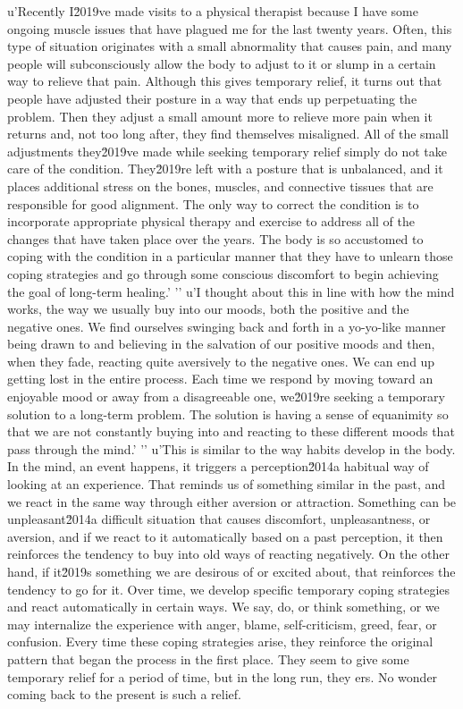 u'Recently I\u2019ve made visits to a physical therapist because I have some ongoing muscle issues that have plagued me for the last twenty years. Often, this type of situation originates with a small abnormality that causes pain, and many people will subconsciously allow the body to adjust to it or slump in a certain way to relieve that pain. Although this gives temporary relief, it turns out that people have adjusted their posture in a way that ends up perpetuating the problem. Then they adjust a small amount more to relieve more pain when it returns and, not too long after, they find themselves misaligned. All of the small adjustments they\u2019ve made while seeking temporary relief simply do not take care of the condition. They\u2019re left with a posture that is unbalanced, and it places additional stress on the bones, muscles, and connective tissues that are responsible for good alignment. The only way to correct the condition is to incorporate appropriate physical therapy and exercise to address all of the changes that have taken place over the years. The body is so accustomed to coping with the condition in a particular manner that they have to unlearn those coping strategies and go through some conscious discomfort to begin achieving the goal of long-term healing.'
'\n'
u'I thought about this in line with how the mind works, the way we usually buy into our moods, both the positive and the negative ones. We find ourselves swinging back and forth in a yo-yo-like manner being drawn to and believing in the salvation of our positive moods and then, when they fade, reacting quite aversively to the negative ones. We can end up getting lost in the entire process. Each time we respond by moving toward an enjoyable mood or away from a disagreeable one, we\u2019re seeking a temporary solution to a long-term problem. The solution is having a sense of equanimity so that we are not constantly buying into and reacting to these different moods that pass through the mind.'
'\n'
u'This is similar to the way habits develop in the body. In the mind, an event happens, it triggers a perception\u2014a habitual way of looking at an experience. That reminds us of something similar in the past, and we react in the same way through either aversion or attraction. Something can be unpleasant\u2014a difficult situation that causes discomfort, unpleasantness, or aversion, and if we react to it automatically based on a past perception, it then reinforces the tendency to buy into old ways of reacting negatively. On the other hand, if it\u2019s something we are desirous of or excited about, that reinforces the tendency to go for it. Over time, we develop specific temporary coping strategies and react automatically in certain ways. We say, do, or think something, or we may internalize the experience with anger, blame, self-criticism, greed, fear, or confusion. Every time these coping strategies arise, they reinforce the original pattern that began the process in the first place. They seem to give some temporary relief for a period of time, but in the long run, they ers. No wonder coming back to the present is such a relief.

